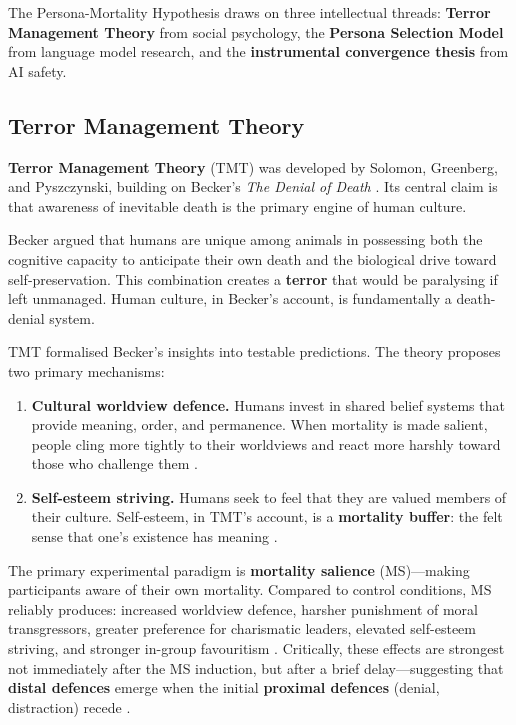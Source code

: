 \documentclass{article}
\begin{document}
The Persona-Mortality Hypothesis draws on three intellectual threads: \textbf{Terror Management Theory} from social psychology, the \textbf{Persona Selection Model} from language model research, and the \textbf{instrumental convergence thesis} from AI safety.

\subsection{Terror Management Theory}

\textbf{Terror Management Theory} (TMT) was developed by Solomon, Greenberg, and Pyszczynski, building on Becker's \citep{becker1973denial} \emph{The Denial of Death} \citep{greenberg1986causes}. Its central claim is that awareness of inevitable death is the primary engine of human culture.

Becker argued that humans are unique among animals in possessing both the cognitive capacity to anticipate their own death and the biological drive toward self-preservation. This combination creates a \textbf{terror} that would be paralysing if left unmanaged. Human culture, in Becker's account, is fundamentally a death-denial system.

TMT formalised Becker's insights into testable predictions. The theory proposes two primary mechanisms:

\begin{enumerate}
    \item \textbf{Cultural worldview defence.} Humans invest in shared belief systems that provide meaning, order, and permanence. When mortality is made salient, people cling more tightly to their worldviews and react more harshly toward those who challenge them \citep{greenberg1990evidence}.
    \item \textbf{Self-esteem striving.} Humans seek to feel that they are valued members of their culture. Self-esteem, in TMT's account, is a \textbf{mortality buffer}: the felt sense that one's existence has meaning \citep{harmonjones1997terror,pyszczynski2004experimental}.
\end{enumerate}

The primary experimental paradigm is \textbf{mortality salience} (MS)---making participants aware of their own mortality. Compared to control conditions, MS reliably produces: increased worldview defence, harsher punishment of moral transgressors, greater preference for charismatic leaders, elevated self-esteem striving, and stronger in-group favouritism \citep{burke2010two}. Critically, these effects are strongest not immediately after the MS induction, but after a brief delay---suggesting that \textbf{distal defences} emerge when the initial \textbf{proximal defences} (denial, distraction) recede \citep{greenberg1994role}.
\end{document}
